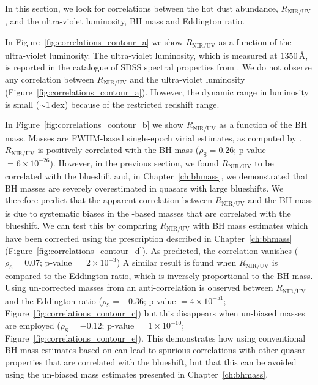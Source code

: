 In this section, we look for correlations between the hot dust abundance, $R_{\text{NIR/UV}}$, and the ultra-violet luminosity, BH mass and Eddington ratio. 

In Figure~\ref{fig:correlations_contour_a} we show $R_{\text{NIR/UV}}$ as a function of the ultra-violet luminosity. 
The ultra-violet luminosity, which is measured at $1350$\,\AA, is reported in the catalogue of SDSS spectral properties from \citet{shen11}. 
We do not observe any correlation between $R_{\text{NIR/UV}}$ and the ultra-violet luminosity (Figure~\ref{fig:correlations_contour_a}). 
However, the dynamic range in luminosity is small ($\sim1$\,dex) because of the restricted redshift range. 

In Figure~\ref{fig:correlations_contour_b} we show $R_{\text{NIR/UV}}$ as a function of the BH mass. 
Masses are  FWHM-based single-epoch virial estimates, as computed by \citet{shen11}. 
$R_{\text{NIR/UV}}$ is positively correlated with the BH mass ($\rho_{\text{S}} = 0.26$; p-value $=6\times10^{-26
}$). 
However, in the previous section, we found $R_{\text{NIR/UV}}$ to be correlated with the  blueshift and, in Chapter~\ref{ch:bhmass}, we demonstrated that BH masses are severely overestimated in quasars with large  blueshifts.
We therefore predict that the apparent correlation between $R_{\text{NIR/UV}}$ and the BH mass is due to systematic biases in the -based masses that are correlated with the  blueshift. 
We can test this by comparing $R_{\text{NIR/UV}}$ with BH mass estimates which have been corrected using the prescription described in Chapter~\ref{ch:bhmass} (Figure~\ref{fig:correlations_contour_d}). 
As predicted, the correlation vanishes ($\rho_{\text{S}}=0.07$; p-value $=2\times10^{-3}$)
A similar result is found when $R_{\text{NIR/UV}}$ is compared to the Eddington ratio, which is inversely proportional to the BH mass.  
Using un-corrected masses from \citet{shen11} an anti-correlation is observed between $R_{\text{NIR/UV}}$ and the Eddington ratio ($\rho_{\text{S}}=-0.36$; p-value $=4\times10^{-51}$; Figure~\ref{fig:correlations_contour_c}) but this disappears when un-biased masses are employed ($\rho_{\text{S}}=-0.12$; p-value $=1\times10^{-10}$; Figure~\ref{fig:correlations_contour_e}). 
This demonstrates how using conventional BH mass estimates based on  can lead to spurious correlations with other quasar properties that are correlated with the  blueshift, but that this can be avoided using the un-biased mass estimates presented in Chapter~\ref{ch:bhmass}. 

